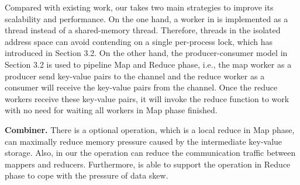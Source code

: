 Compared with existing work, our \myds takes two main strategies to improve its scalability and performance.
On the one hand, a worker in \myds is implemented as a \myth thread instead of a shared-memory thread.
Therefore, threads in the isolated address space can avoid contending on a single per-process lock, which has introduced in Section 3.2.
On the other hand, the producer-consumer model in Section 3.2 is used to pipeline Map and Reduce phase,
i.e., the map worker as a producer send key-value pairs to the channel and  the reduce worker as a consumer will receive the key-value pairs from the channel. 
Once the reduce workers receive these key-value pairs, it will invoke the reduce function to work with no need for waiting all workers in Map phase finished.


%
{\bf Combiner.}
There is a optional  operation, which is a local reduce in Map phase, can maximally reduce memory pressure caused by the intermediate key-value storage.
Also, in our \myds the  operation can reduce the communication traffic  between mappers and reducers.
Furthermore, \myds is able to support the  operation in Reduce phase to cope with the pressure of data skew. 

